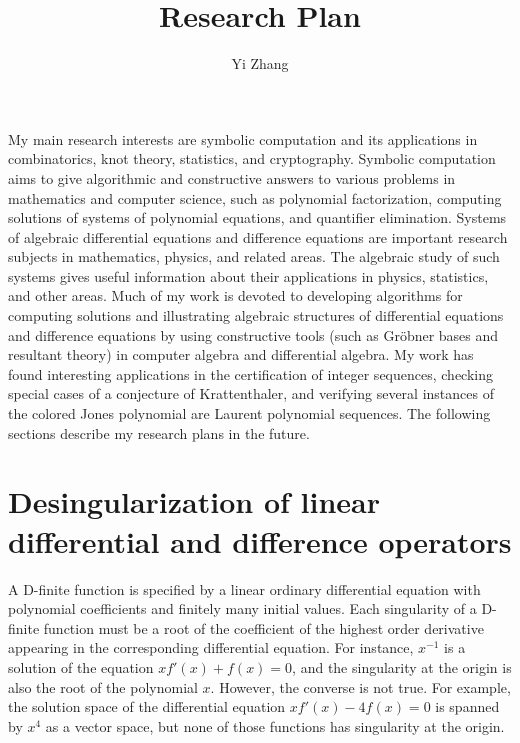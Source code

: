 \documentclass[10pt,a4paper]{article}
\begin{document}
\title{\bf{\Huge{Research Plan}}}

\author{Yi Zhang}



\date{}
\maketitle

My main research interests are symbolic computation and its applications in combinatorics, knot theory, statistics, 
and cryptography.  Symbolic computation aims to give algorithmic and constructive answers 
to various problems in mathematics and computer science, such as polynomial factorization, computing solutions of systems of polynomial equations, 
and quantifier elimination. Systems of algebraic differential equations and difference equations are important research subjects in mathematics, physics, and related areas. 
The algebraic study of such systems gives useful information about their applications in physics, statistics, and other areas. 
Much of my work is devoted to developing algorithms for  computing solutions and illustrating algebraic structures of differential equations and difference equations
by using constructive tools (such as Gr\"obner bases and resultant theory) in computer algebra and differential algebra. 
My work has found interesting applications in the certification of integer sequences, checking special cases of a conjecture of Krattenthaler, and verifying 
several instances of the colored Jones polynomial are Laurent polynomial sequences.  
The following sections describe my research plans in the future. 

\section*{Desingularization of linear differential and difference operators}

A D-finite function is specified by a linear ordinary differential equation with polynomial 
coefficients and finitely many initial values. Each singularity of a D-finite function 
must be a root of the coefficient of the highest order derivative appearing 
in the corresponding differential equation. 
For instance, $x^{-1}$ is a solution of the equation $x f'(x) + f(x) = 0$, 
and the singularity at the origin is also the root of the polynomial $x$. 
However, the converse is not true. For example, the solution space of 
the differential equation $x f'(x) - 4 f(x) = 0$ is spanned by $x^4$ as a vector space, 
but none of those functions has singularity at the origin. 
\end{document}
